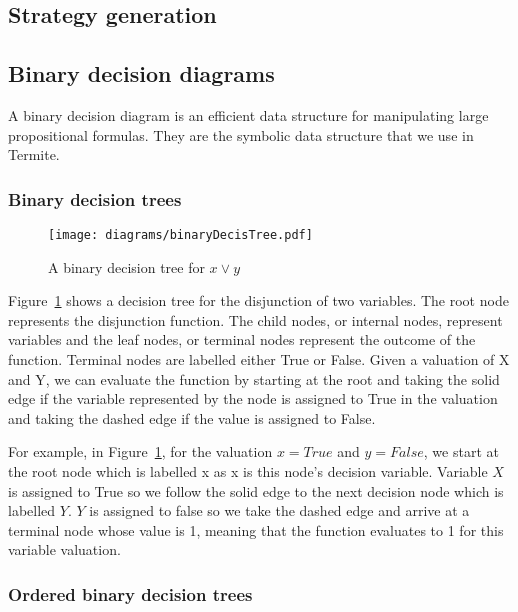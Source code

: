 \subsection{Strategy generation}


\subsection{Binary decision diagrams}

A binary decision diagram is an efficient data structure for manipulating large propositional formulas. They are the symbolic data structure that we use in Termite.

\subsubsection{Binary decision trees}

\begin{figure}[t]
\centering
\texttt{[image: diagrams/binaryDecisTree.pdf]}
\caption{A binary decision tree for $x \vee y$}
\label{fig:decis_tree}
\end{figure}

Figure~\ref{fig:decis_tree} shows a decision tree for the disjunction of two variables. The root node represents the disjunction function. The child nodes, or internal nodes, represent variables and the leaf nodes, or terminal nodes represent the outcome of the function. Terminal nodes are labelled either True or False. Given a valuation of X and Y, we can evaluate the function by starting at the root and taking the solid edge if the variable represented by the node is assigned to True in the valuation and taking the dashed edge if the value is assigned to False. 

For example, in Figure~\ref{fig:decis_tree}, for the valuation $x=True$ and $y=False$, we start at the root node which is labelled x as x is this node's decision variable. Variable $X$ is assigned to True so we follow the solid edge to the next decision node which is labelled $Y$. $Y$ is assigned to false so we take the dashed edge and arrive at a terminal node whose value is 1, meaning that the function evaluates to 1 for this variable valuation.

\subsubsection{Ordered binary decision trees}

